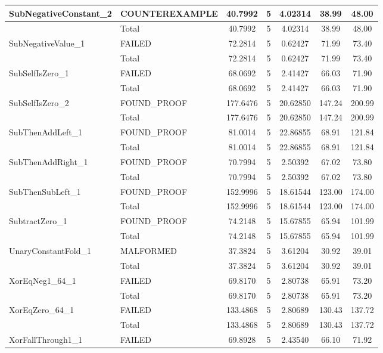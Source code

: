 \begin{appendices}
\begin{longtable}{L{0.25\textwidth} L{0.2\textwidth}  c  c  c  c  c }
    SubNegativeConstant\_2 & COUNTEREXAMPLE & 40.7992 & 5 & 4.02314 & 38.99 & 48.00 \\ \midrule 
    & Total & 40.7992 & 5 & 4.02314 & 38.99 & 48.00 \\ \midrule 
    SubNegativeValue\_1 & FAILED & 72.2814 & 5 & 0.62427 & 71.99 & 73.40 \\ \midrule 
    & Total & 72.2814 & 5 & 0.62427 & 71.99 & 73.40 \\ \midrule 
    SubSelfIsZero\_1 & FAILED & 68.0692 & 5 & 2.41427 & 66.03 & 71.90 \\ \midrule 
    & Total & 68.0692 & 5 & 2.41427 & 66.03 & 71.90 \\ \midrule 
    SubSelfIsZero\_2 & FOUND\_PROOF & 177.6476 & 5 & 20.62850 & 147.24 & 200.99 \\ \midrule 
    & Total & 177.6476 & 5 & 20.62850 & 147.24 & 200.99 \\ \midrule 
    SubThenAddLeft\_1 & FOUND\_PROOF & 81.0014 & 5 & 22.86855 & 68.91 & 121.84 \\ \midrule 
    & Total & 81.0014 & 5 & 22.86855 & 68.91 & 121.84 \\ \midrule 
    SubThenAddRight\_1 & FOUND\_PROOF & 70.7994 & 5 & 2.50392 & 67.02 & 73.80 \\ \midrule 
    & Total & 70.7994 & 5 & 2.50392 & 67.02 & 73.80 \\ \midrule 
    SubThenSubLeft\_1 & FOUND\_PROOF & 152.9996 & 5 & 18.61544 & 123.00 & 174.00 \\ \midrule 
    & Total & 152.9996 & 5 & 18.61544 & 123.00 & 174.00 \\ \midrule 
    SubtractZero\_1 & FOUND\_PROOF & 74.2148 & 5 & 15.67855 & 65.94 & 101.99 \\ \midrule 
    & Total & 74.2148 & 5 & 15.67855 & 65.94 & 101.99 \\ \midrule 
    UnaryConstantFold\_1 & MALFORMED & 37.3824 & 5 & 3.61204 & 30.92 & 39.01 \\ \midrule 
    & Total & 37.3824 & 5 & 3.61204 & 30.92 & 39.01 \\ \midrule 
    XorEqNeg1\_64\_1 & FAILED & 69.8170 & 5 & 2.80738 & 65.91 & 73.20 \\ \midrule 
    & Total & 69.8170 & 5 & 2.80738 & 65.91 & 73.20 \\ \midrule 
    XorEqZero\_64\_1 & FAILED & 133.4868 & 5 & 2.80689 & 130.43 & 137.72 \\ \midrule 
    & Total & 133.4868 & 5 & 2.80689 & 130.43 & 137.72 \\ \midrule 
    XorFallThrough1\_1 & FAILED & 69.8928 & 5 & 2.43540 & 66.10 & 71.92 \\ \midrule 

\end{longtable}
\end{appendices}
